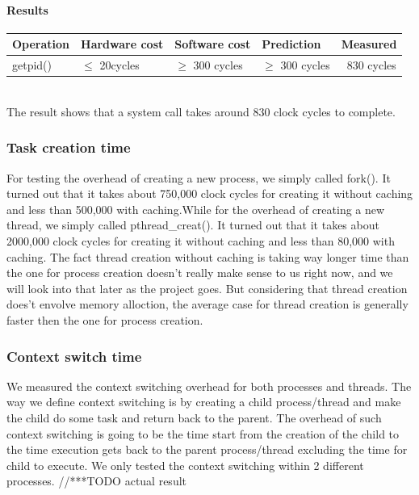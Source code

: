 \paragraph{Results}
\begin{tabular}{| l | l | l | l | l |}
\hline
Operation & Hardware cost & Software cost & Prediction & Measured \\ \hline
getpid()  & $\le$ 20cycles  & $\ge$ 300 cycles  & $\ge$ 300 cycles & ~830 cycles \\ \hline
\end{tabular} \\
The result shows that a system call takes around 830 clock cycles to complete.

\subsubsection{Task creation time}
For testing the overhead of creating a new process, we simply called fork(). It turned out that it takes about 750,000 clock cycles for creating it without caching and less than 500,000 with caching.While for the overhead of creating a new thread, we simply called pthread\_creat(). It turned out that it takes about 2000,000 clock cycles for creating it without caching and less than 80,000 with caching.
The fact thread creation without caching is taking way longer time than the one for process creation doesn't really make sense to us right now, and we will look into that later as the project goes. But considering that thread creation does't envolve memory alloction, the average case for thread creation is generally faster then the one for process creation.


\subsubsection{Context switch time}
We measured the context switching overhead for both processes and threads. The way we define context switching is by creating a child process/thread and make the child do some task and return back to the parent. The overhead of such context switching is going to be the time start from the creation of the child to the time execution gets back to the parent process/thread excluding the time for child to execute. We only tested the context switching within 2 different processes.
//***TODO actual result



